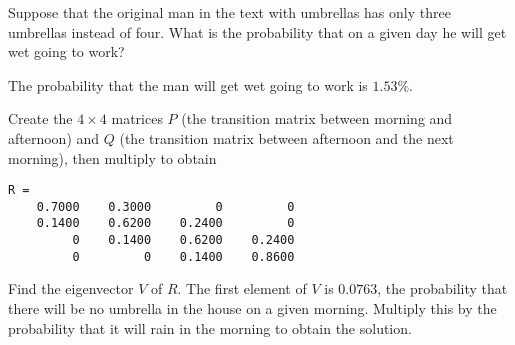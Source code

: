 \documentclass{ximera}
\begin{document}
\begin{computerExercise} \label{c4.10.9}
Suppose that the original man in the text with umbrellas has only three
umbrellas instead of four.  What is the probability that on a given day he
will get wet going to work?

\begin{solution}

\ans The probability that the man will get wet going to work is $1.53\%$.

\soln Create the $4 \times 4$ matrices $P$ (the transition matrix between
morning and afternoon) and $Q$ (the transition matrix between afternoon
and the next morning), then multiply to obtain \begin{verbatim}
R =
    0.7000    0.3000         0         0
    0.1400    0.6200    0.2400         0
         0    0.1400    0.6200    0.2400
         0         0    0.1400    0.8600
\end{verbatim}
Find the eigenvector $V$ of $R$.  The first element of $V$ is $0.0763$,
the probability that there will be no umbrella in the house on a given
morning.  Multiply this by the probability that it will rain in the
morning to obtain the solution.



\end{solution}
\end{computerExercise}
\end{document}
